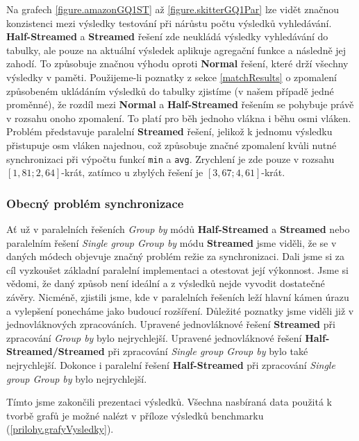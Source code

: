 Na grafech \ref{figure.amazonGQ1ST} až \ref{figure.skitterGQ1Par} lze vidět značnou konzistenci mezi výsledky testování při nárůstu počtu výsledků vyhledávání.
\textbf{Half-Streamed} a \textbf{Streamed} řešení zde neukládá výsledky vyhledávání do tabulky, ale pouze na aktuální výsledek aplikuje agregační funkce a následně jej zahodí.
To způsobuje značnou výhodu oproti \textbf{Normal} řešení, které drží všechny výsledky v paměti.
Použijeme-li poznatky z sekce \ref{matchResults} o zpomalení způsobeném ukládáním výsledků do tabulky zjistíme (v našem případě jedné proměnné), že rozdíl mezi \textbf{Normal} a \textbf{Half-Streamed} řešením se pohybuje právě v rozsahu onoho zpomalení.
To platí pro běh jednoho vlákna i běhu osmi vláken. 
Problém představuje paralelní \textbf{Streamed} řešení, jelikož k jednomu výsledku přistupuje osm vláken najednou, což způsobuje značné zpomalení kvůli nutné synchronizaci při výpočtu funkcí \verb+min+ a \verb+avg+. 
Zrychlení je zde pouze v rozsahu $[1,81; 2,64]$-krát, zatímco u zbylých řešení je $[3,67; 4,61]$-krát.

\subsubsection{Obecný problém synchronizace}

Ať už v paralelních řešeních \textit{Group by} módů \textbf{Half-Streamed} a \textbf{Streamed} nebo paralelním řešení \textit{Single group Group by} módu \textbf{Streamed} jsme viděli, že se v daných módech objevuje značný problém režie za synchronizaci.
Dali jsme si za cíl vyzkoušet základní paralelní implementaci a otestovat její výkonnost.
Jsme si vědomi, že daný způsob není ideální a z výsledků nejde vyvodit dostatečné závěry.
Nicméně, zjistili jsme, kde v paralelních řešeních leží hlavní kámen úrazu a vylepšení ponecháme jako budoucí rozšíření.
Důležité poznatky jsme viděli již v jednovláknových zpracováních.
Upravené jednovláknové řešení \textbf{Streamed} při zpracování \textit{Group by} bylo nejrychlejší.
Upravené jednovláknové řešení \textbf{Half-Streamed/Streamed} při zpracování \textit{Single group Group by} bylo také nejrychlejší.
Dokonce i paralelní řešení \textbf{Half-Streamed} při zpracování \textit{Single group Group by} bylo nejrychlejší.

\bigskip
Tímto jsme zakončili prezentaci výsledků. 
Všechna nasbíraná data použitá k tvorbě grafů je možné nalézt v příloze výsledků benchmarku (\ref{prilohy.grafyVysledky}). 

